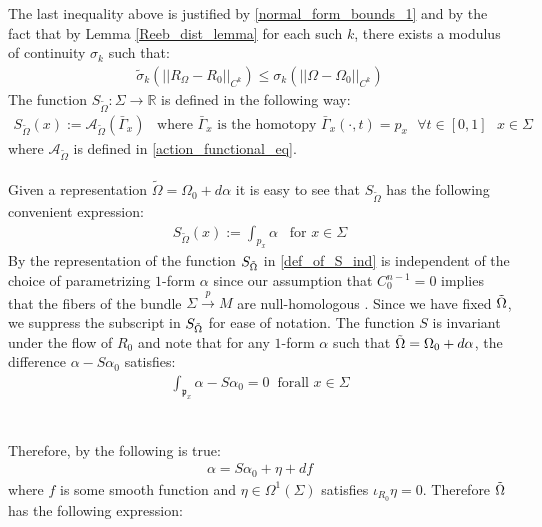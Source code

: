 \documentclass[11pt]{amsart}
\theoremstyle{plain}
\theoremstyle{definition}
\theoremstyle{remark}
\begin{document}
The last inequality above is justified by \eqref{normal_form_bounds_1} and by the fact that by Lemma \ref{Reeb_dist_lemma} for each such $k$, there exists a modulus of continuity $\sigma_{k}$ such that:
\begin{align}
     \tilde{\sigma}_{k}(\vert \vert R_{\Omega} - R_{0} \vert \vert_{C^{k}}) \leq \sigma_{k}( \vert \vert \Omega - \Omega_0\vert \vert_{C^{k}})
\end{align}
The function $S_{\tilde{\Omega}}: \Sigma \rightarrow \mathbb{R}$ is defined in the following way:
\begin{align}\label{def_of_S}
     S_{\tilde{\Omega}}(x):= \mathcal{A}_{\tilde{\Omega}}(\bar{\Gamma}_{x}) \;\;\;\text{where $\bar{\Gamma}_{x}$ is the homotopy $\bar{\Gamma}_x(\cdot,t) = p_x$ $\forall t \in [0,1]$   } x \in \Sigma 
\end{align}
where $\mathcal{A}_{\tilde{\Omega}}$ is defined in \eqref{action_functional_eq}.\\
\\
Given a representation $\tilde{\Omega} = \Omega_0 + d\alpha$ it is easy to see that $S_{\tilde{\Omega}}$ has the following convenient expression:
\begin{align}\label{def_of_S_ind}
    S_{\tilde{\Omega}}(x):= \int_{p_x} \alpha \;\;\; \text{for } x\in \Sigma
\end{align}
By \cite[Proposition 6.7]{B-K-Odd_Symp} the representation of the function $S_{\Tilde{\Omega}}$ in \eqref{def_of_S_ind} is independent of the choice of parametrizing $1$-form $\alpha$ since our assumption that $C_0^{n-1} =0$ implies that the fibers of the bundle $\Sigma \xrightarrow{p} M$ are null-homologous \cite[Lemma 4.5]{B-K-Odd_Symp}. Since we have fixed $\Tilde{\Omega}$, we suppress the subscript in $S_{\Tilde{\Omega}}$ for ease of notation. The function $S$ is invariant under the flow of $R_0$ and note that for any $1$-form $\alpha$ such that $\Tilde{\Omega} = \Omega_0 + d\alpha$, the difference $\alpha - S\alpha_0$ satisfies:
\begin{align}
    \int_{\mathfrak{p}_x} \alpha - S\alpha_0 =0 \;\; \text{forall $x \in \Sigma$}
\end{align}
\\
\\
Therefore, by \cite[Lemma 1.3]{Abbondandolo-Benedetti} the following is true:
\begin{align}\label{alpha_eta_alpha_0}
    \alpha = S\alpha_0 + \eta +df
\end{align}
where $f$ is some smooth function and $\eta \in \Omega^1(\Sigma)$ satisfies $\iota_{R_{0}} \eta =0$. Therefore $\Tilde{\Omega}$ has the following expression:
\end{document}
